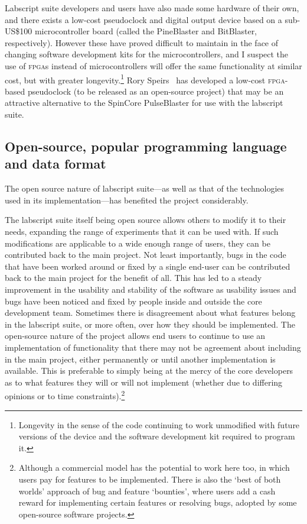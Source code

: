 Labscript suite developers and users have also made some hardware of their own, and there exists a low-cost pseudoclock and digital output device based on a sub-US\$100 microcontroller board (called the PineBlaster and BitBlaster, respectively). However these have proved difficult to maintain in the face of changing software development kits for the microcontrollers, and I suspect the use of \textsc{fpga}s instead of microcontrollers will offer the same functionality at similar cost, but with greater longevity.\footnote{Longevity in the sense of the code continuing to work unmodified with future versions of the device and the software development kit required to program it.} Rory Speirs~\cite{speirs__2018-1} has developed a low-cost \textsc{fpga}-based pseudoclock (to be released as an open-source project) that may be an attractive alternative to the SpinCore PulseBlaster for use with the labscript suite.

\subsection{Open-source, popular programming language and data format}

The open source nature of labscript suite---as well as that of the technologies used in its implementation---has benefited the project considerably.

The labscript suite itself being open source allows others to modify it to their needs, expanding the range of experiments that it can be used with. If such modifications are applicable to a wide enough range of users, they can be contributed back to the main project. Not least importantly, bugs in the code that have been worked around or fixed by a single end-user can be contributed back to the main project for the benefit of all. This has led to a steady improvement in the usability and stability of the software as usability issues and bugs have been noticed and fixed by people inside and outside the core development team. Sometimes there is disagreement about what features belong in the labscript suite, or more often, over how they should be implemented. The open-source nature of the project allows end users to continue to use an implementation of functionality that there may not be agreement about including in the main project, either permanently or until another implementation is available. This is preferable to simply being at the mercy of the core developers as to what features they will or will not implement (whether due to differing opinions or to time constraints).\footnote{Although a commercial model has the potential to work here too, in which users pay for features to be implemented. There is also the `best of both worlds' approach of bug and feature `bounties', where users add a cash reward for implementing certain features or resolving bugs, adopted by some open-source software projects.}

